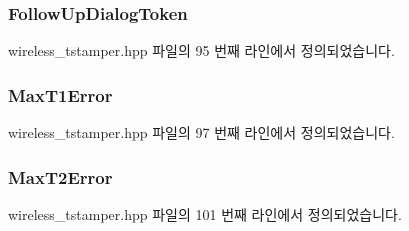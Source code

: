 \subsubsection[{\texorpdfstring{Follow\+Up\+Dialog\+Token}{FollowUpDialogToken}}]{ Follow\+Up\+Dialog\+Token}\hypertarget{struct___t_i_m_i_n_g_m_s_m_t___e_v_e_n_t___d_a_t_a_afdd9c8d70ef57e009dbc261c82f6c5ce}{}\label{struct___t_i_m_i_n_g_m_s_m_t___e_v_e_n_t___d_a_t_a_afdd9c8d70ef57e009dbc261c82f6c5ce}


wireless\+\_\+tstamper.\+hpp 파일의 95 번째 라인에서 정의되었습니다.

\subsubsection[{\texorpdfstring{Max\+T1\+Error}{MaxT1Error}}]{ Max\+T1\+Error}\hypertarget{struct___t_i_m_i_n_g_m_s_m_t___e_v_e_n_t___d_a_t_a_a3d7b08143ed2de0d074093ec3256c18e}{}\label{struct___t_i_m_i_n_g_m_s_m_t___e_v_e_n_t___d_a_t_a_a3d7b08143ed2de0d074093ec3256c18e}


wireless\+\_\+tstamper.\+hpp 파일의 97 번째 라인에서 정의되었습니다.

\subsubsection[{\texorpdfstring{Max\+T2\+Error}{MaxT2Error}}]{ Max\+T2\+Error}\hypertarget{struct___t_i_m_i_n_g_m_s_m_t___e_v_e_n_t___d_a_t_a_ae66ce688ccf1e0463cea2627ac245de6}{}\label{struct___t_i_m_i_n_g_m_s_m_t___e_v_e_n_t___d_a_t_a_ae66ce688ccf1e0463cea2627ac245de6}


wireless\+\_\+tstamper.\+hpp 파일의 101 번째 라인에서 정의되었습니다.

